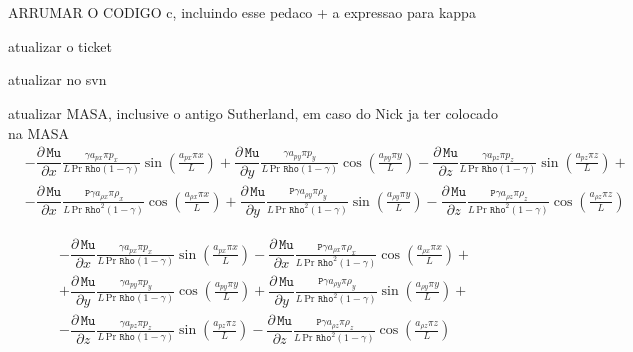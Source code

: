 \documentclass[10pt]{article}
\title{}
\author{}
\newcommand{\diff}[2] {\dfrac{\partial #1}{\partial #2}}
\newcommand{\Rho}{\,\mathtt{Rho}}
\newcommand{\PP}{\,\mathtt{P}}
\newcommand{\Mu}{\,\mathtt{Mu}}
\newcommand{\DMuDx}{\diff{\Mu}{x}}
\newcommand{\DMuDy}{\diff{\Mu}{y}}
\newcommand{\DMuDz}{\diff{\Mu}{z}}
\begin{document}
\maketitle

\begin{abstract}

\end{abstract}

\section{}

ARRUMAR O CODIGO c, incluindo esse pedaco + a expressao para kappa


atualizar o ticket

atualizar no svn

atualizar MASA, inclusive o antigo Sutherland, em caso do Nick ja ter colocado na MASA
\begin{equation}
 \begin{split}
&- \DMuDx \frac{\gamma a_{px} \pi p_{x} }{L\, \text{Pr} \, \Rho \left(1 - \gamma\right)} \sin\left(\frac{ a_{px} \pi x}{L}\right)
+\DMuDy \frac{\gamma a_{py} \pi p_{y} }{L\, \text{Pr} \, \Rho \left(1 - \gamma\right)} \cos\left(\frac{ a_{py} \pi y}{L}\right)
- \DMuDz \frac{\gamma a_{pz} \pi p_{z} }{L\, \text{Pr} \, \Rho \left(1 - \gamma\right)}\sin\left(\frac{ a_{pz} \pi z}{L}\right) +\\
&- \DMuDx \frac{\PP \gamma  a_{\rho x} \pi \rho_{x} }{L\, \text{Pr} \, \Rho^{2} \left(1 - \gamma\right)} \cos\left(\frac{ a_{\rho x} \pi x}{L}\right)
+ \DMuDy \frac{\PP \gamma  a_{\rho y} \pi \rho_{y} }{L\, \text{Pr} \, \Rho^{2} \left(1 - \gamma\right)} \sin\left(\frac{ a_{\rho y} \pi y}{L}\right)
- \DMuDz \frac{\PP \gamma  a_{\rho z} \pi \rho_{z} }{L\, \text{Pr} \, \Rho^{2} \left(1 - \gamma\right)}\cos\left(\frac{ a_{\rho z} \pi z}{L}\right)
 \end{split}
\end{equation}



\begin{equation}
 \begin{split}
&- \DMuDx \frac{\gamma a_{px} \pi p_{x} }{L\, \text{Pr} \, \Rho \left(1 - \gamma\right)} \sin\left(\frac{ a_{px} \pi x}{L}\right)
- \DMuDx \frac{\PP \gamma  a_{\rho x} \pi \rho_{x} }{L\, \text{Pr} \, \Rho^{2} \left(1 - \gamma\right)} \cos\left(\frac{ a_{\rho x} \pi x}{L}\right)+\\
&+\DMuDy \frac{\gamma a_{py} \pi p_{y} }{L\, \text{Pr} \, \Rho \left(1 - \gamma\right)} \cos\left(\frac{ a_{py} \pi y}{L}\right)
+ \DMuDy \frac{\PP \gamma  a_{\rho y} \pi \rho_{y} }{L\, \text{Pr} \, \Rho^{2} \left(1 - \gamma\right)} \sin\left(\frac{ a_{\rho y} \pi y}{L}\right)+\\
&- \DMuDz \frac{\gamma a_{pz} \pi p_{z} }{L\, \text{Pr} \, \Rho \left(1 - \gamma\right)}\sin\left(\frac{ a_{pz} \pi z}{L}\right) - \DMuDz \frac{\PP \gamma  a_{\rho z} \pi \rho_{z} }{L\, \text{Pr} \, \Rho^{2} \left(1 - \gamma\right)}\cos\left(\frac{ a_{\rho z} \pi z}{L}\right)
 \end{split}
\end{equation}
\end{document}
